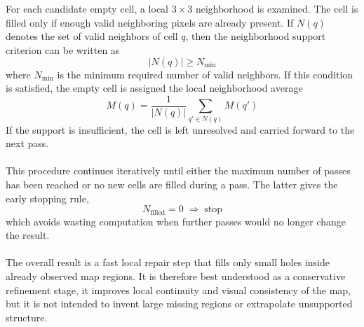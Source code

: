 \\ \\
For each candidate empty cell, a local $3 \times 3$ neighborhood is examined. The cell is filled only if enough valid neighboring pixels are already present. If $N(q)$ denotes the set of valid neighbors of cell $q$, then the neighborhood support criterion can be written as
\begin{equation}
    |N(q)| \geq N_{\min}
    \label{eq:local-map-generation-gapfill-support}
\end{equation}
where $N_{\min}$ is the minimum required number of valid neighbors. If this condition is satisfied, the empty cell is assigned the local neighborhood average
\begin{equation}
    M(q) = \frac{1}{|N(q)|}\sum_{q' \in N(q)} M(q')
    \label{eq:local-map-generation-gapfill-update}
\end{equation}
If the support is insufficient, the cell is left unresolved and carried forward to the next pass.
\\ \\
This procedure continues iteratively until either the maximum number of passes has been reached or no new cells are filled during a pass. The latter gives the early stopping rule,
\begin{equation}
    N_{\mathrm{filled}} = 0 \;\Rightarrow\; \text{stop}
    \label{eq:local-map-generation-gapfill-stop}
\end{equation}
which avoids wasting computation when further passes would no longer change the result.
\\ \\
The overall result is a fast local repair step that fills only small holes inside already observed map regions. It is therefore best understood as a conservative refinement stage, it improves local continuity and visual consistency of the map, but it is not intended to invent large missing regions or extrapolate unsupported structure.



